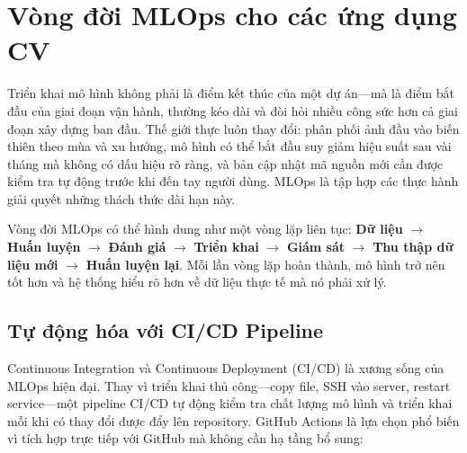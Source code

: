 \section{Vòng đời MLOps cho các ứng dụng CV}
\label{sec:mlops_lifecycle}

Triển khai mô hình không phải là điểm kết thúc của một dự án---mà là điểm bắt đầu của giai đoạn vận hành, thường kéo dài và đòi hỏi nhiều công sức hơn cả giai đoạn xây dựng ban đầu. Thế giới thực luôn thay đổi: phân phối ảnh đầu vào biến thiên theo mùa và xu hướng, mô hình có thể bắt đầu suy giảm hiệu suất sau vài tháng mà không có dấu hiệu rõ ràng, và bản cập nhật mã nguồn mới cần được kiểm tra tự động trước khi đến tay người dùng. MLOps là tập hợp các thực hành giải quyết những thách thức dài hạn này.

Vòng đời MLOps có thể hình dung như một vòng lặp liên tục: \textbf{Dữ liệu} $\rightarrow$ \textbf{Huấn luyện} $\rightarrow$ \textbf{Đánh giá} $\rightarrow$ \textbf{Triển khai} $\rightarrow$ \textbf{Giám sát} $\rightarrow$ \textbf{Thu thập dữ liệu mới} $\rightarrow$ \textbf{Huấn luyện lại}. Mỗi lần vòng lặp hoàn thành, mô hình trở nên tốt hơn và hệ thống hiểu rõ hơn về dữ liệu thực tế mà nó phải xử lý.

\subsection*{Tự động hóa với CI/CD Pipeline}

Continuous Integration và Continuous Deployment (CI/CD) là xương sống của MLOps hiện đại. Thay vì triển khai thủ công---copy file, SSH vào server, restart service---một pipeline CI/CD tự động kiểm tra chất lượng mô hình và triển khai mỗi khi có thay đổi được đẩy lên repository. GitHub Actions là lựa chọn phổ biến vì tích hợp trực tiếp với GitHub mà không cần hạ tầng bổ sung:

